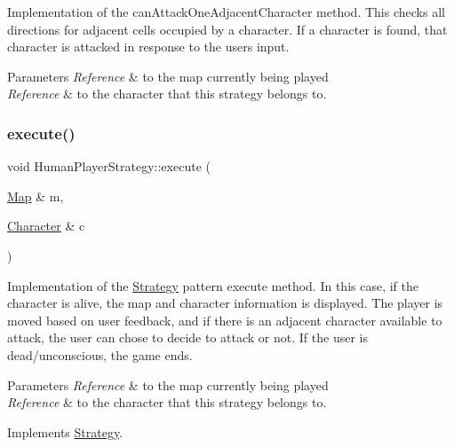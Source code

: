 Implementation of the can\+Attack\+One\+Adjacent\+Character method. This checks all directions for adjacent cells occupied by a character. If a character is found, that character is attacked in response to the user\textquotesingle{}s input. 
\begin{DoxyParams}{Parameters}
{\em Reference} & to the map currently being played \\
\hline
{\em Reference} & to the character that this strategy belongs to. \\
\hline
\end{DoxyParams}
\hypertarget{classHumanPlayerStrategy_a6bd8ba3a590ee457282f57074d66809d}{}\label{classHumanPlayerStrategy_a6bd8ba3a590ee457282f57074d66809d} 
\subsubsection{\texorpdfstring{execute()}{execute()}}
{\footnotesize\ttfamily void Human\+Player\+Strategy\+::execute (\begin{DoxyParamCaption}\item[{\hyperlink{classMap}{Map} \&}]{m,  }\item[{\hyperlink{classCharacter}{Character} \&}]{c }\end{DoxyParamCaption})\hspace{0.3cm}{\ttfamily [virtual]}}

Implementation of the \hyperlink{classStrategy}{Strategy} pattern execute method. In this case, if the character is alive, the map and character information is displayed. The player is moved based on user feedback, and if there is an adjacent character available to attack, the user can chose to decide to attack or not. If the user is dead/unconscious, the game ends. 
\begin{DoxyParams}{Parameters}
{\em Reference} & to the map currently being played \\
\hline
{\em Reference} & to the character that this strategy belongs to. \\
\hline
\end{DoxyParams}


Implements \hyperlink{classStrategy}{Strategy}.

\hypertarget{classHumanPlayerStrategy_ac47c76361d47fd0429c5ccaa81f4ae3f}{}\label{classHumanPlayerStrategy_ac47c76361d47fd0429c5ccaa81f4ae3f} 
